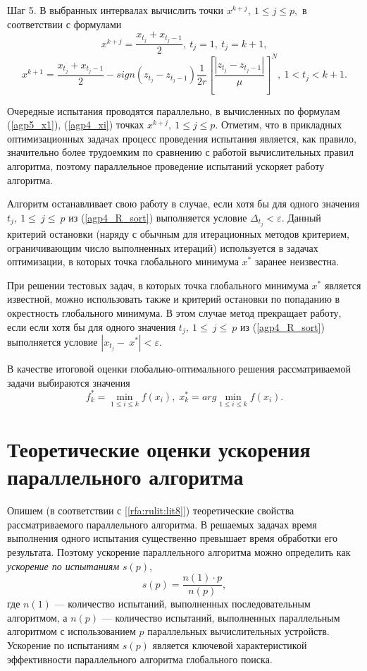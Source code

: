 \documentclass[10pt,a4paper]{book}
\begin{document}
Шаг 5. В выбранных интервалах вычислить точки $x^{k+j},\ 1\leq j\leq p,$ в соответствии с формулами
\begin{equation}
\label{agp5_x1}
	x^{k+j}=\frac{x_{t_j}+x_{t_j-1}}{2},\ t_j=1,\ t_j=k+1,
\end{equation}	
	\begin{equation}
\label{agp4_xi}	
	x^{k+1}=\frac{x_{t_j}+x_{t_j-1}}{2}-sign\left(z_{t_j}-z_{t_j-1}\right)\frac{1}{2r}\left[\frac{\left|z_{t_j}-z_{t_j-1}\right|}{\mu}\right]^N,\ 1<t_j<k+1.
\end{equation}	

Очередные испытания проводятся параллельно, в вычисленных по формулам (\ref{agp5_x1}), (\ref{agp4_xi}) точках $x^{k+j},\ 1\leq j\leq p$.
Отметим, что в прикладных оптимизационных задачах процесс проведения испытания является, как правило, значительно более трудоемким по сравнению с работой вычислительных правил алгоритма, поэтому параллельное проведение испытаний ускоряет работу алгоритма.

Алгоритм останавливает свою работу в случае, если хотя бы для одного значения $t_j,\ 1\le\ j\le\ p$ из (\ref{agp4_R_sort}) выполняется условие \(\Delta_{t_j} < \varepsilon\). Данный критерий остановки (наряду с обычным для итерационных методов критерием, ограничивающим число выполненных итераций) используется в задачах оптимизации, в которых точка глобального минимума $x^*$ заранее неизвестна. 
	 
При решении тестовых задач, в которых точка глобального минимума $x^*$ является  известной, можно использовать также и критерий остановки по попаданию в окрестность глобального минимума. В этом случае метод прекращает работу, если если хотя бы для одного значения $t_j,\ 1\le\ j\le\ p$ из (\ref{agp4_R_sort}) выполняется условие $\left|x_{t_j}-\ x^\ast\right| < \varepsilon.$
	
В качестве итоговой оценки глобально-оптимального решения рассматриваемой задачи выбираются значения 
\begin{equation}
f_k^*=\min_{1\leq i \leq k}f(x_i), \; x_k^*=arg \min_{1\leq i \leq k}f(x_i).
\end{equation}


\section{Теоретические оценки ускорения параллельного алгоритма}

Опишем (в соответствии с [\ref{rfa:rulit:lit8}]) теоретические свойства рассматриваемого параллельного алгоритма. В решаемых задачах время выполнения одного испытания существенно превышает время обработки его результата. Поэтому ускорение параллельного алгоритма можно определить как \textit{ускорение по испытаниям} $s(p)$,
\begin{equation} \label{par_trl_ref}
s(p) = \frac{n(1) \cdot p}{n(p)},
\end{equation}
где $n(1)$ --- количество испытаний, выполненных последовательным алгоритмом, а $n(p)$ --- количество испытаний, выполненных параллельным алгоритмом с использованием $p$ параллельных вычислительных устройств. Ускорение по испытаниям $s(p)$ является ключевой характеристикой эффективности параллельного алгоритма глобального поиска.
\end{document}
